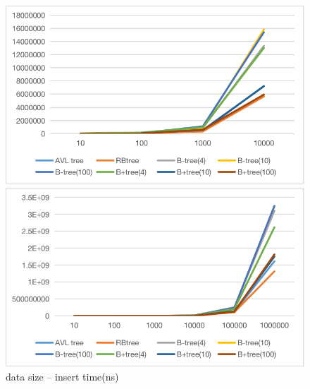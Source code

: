 \documentclass{article}
\begin{document}
\begin{figure}[htbp]
    \centering

	\begin{minipage}{0.49\linewidth}
		\centering
		\includegraphics[width = \textwidth]{result1.png}
	\end{minipage}
	\begin{minipage}{0.49\linewidth}
		\centering
		\includegraphics[width = \textwidth]{result2.png}
	\end{minipage}

    \caption{data size -- insert time(ns)}
    \label{data1}
\end{figure}
\end{document}

